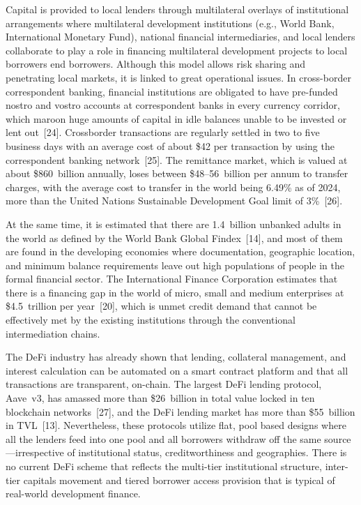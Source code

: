 \documentclass[12pt,a4paper]{report}
\begin{document}
Capital is provided to local lenders through multilateral overlays of institutional arrangements where multilateral development institutions (e.g., World Bank, International Monetary Fund), national financial intermediaries, and local lenders collaborate to play a role in financing multilateral development projects to local borrowers end borrowers. Although this model allows risk sharing and penetrating local markets, it is linked to great operational issues. In cross-border correspondent banking, financial institutions are obligated to have pre-funded nostro and vostro accounts at correspondent banks in every currency corridor, which maroon huge amounts of capital in idle balances unable to be invested or lent out~[24]. Crossborder transactions are regularly settled in two to five business days with an average cost of about \$42 per transaction by using the correspondent banking network~[25]. The remittance market, which is valued at about \$860~billion annually, loses between \$48--56~billion per annum to transfer charges, with the average cost to transfer in the world being 6.49\% as of 2024, more than the United Nations Sustainable Development Goal limit of 3\%~[26].

At the same time, it is estimated that there are 1.4~billion unbanked adults in the world as defined by the World Bank Global Findex~[14], and most of them are found in the developing economies where documentation, geographic location, and minimum balance requirements leave out high populations of people in the formal financial sector. The International Finance Corporation estimates that there is a financing gap in the world of micro, small and medium enterprises at \$4.5~trillion per year~[20], which is unmet credit demand that cannot be effectively met by the existing institutions through the conventional intermediation chains.

The DeFi industry has already shown that lending, collateral management, and interest calculation can be automated on a smart contract platform and that all transactions are transparent, on-chain. The largest DeFi lending protocol, Aave~v3, has amassed more than \$26~billion in total value locked in ten blockchain networks~[27], and the DeFi lending market has more than \$55~billion in TVL~[13]. Nevertheless, these protocols utilize flat, pool based designs where all the lenders feed into one pool and all borrowers withdraw off the same source---irrespective of institutional status, creditworthiness and geographies. There is no current DeFi scheme that reflects the multi-tier institutional structure, inter-tier capitals movement and tiered borrower access provision that is typical of real-world development finance.
\end{document}
